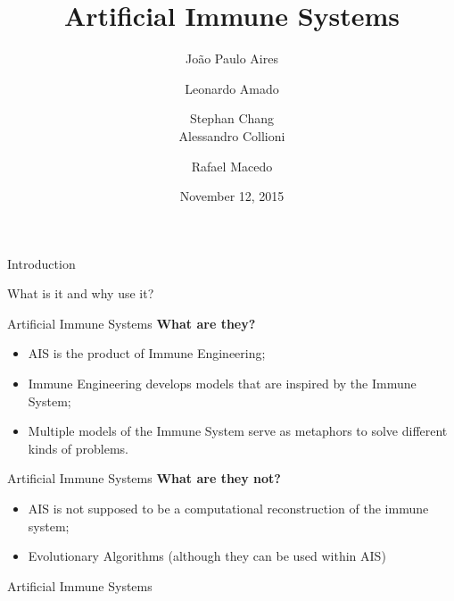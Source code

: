 \documentclass[xcolor=svgnames]{beamer}
\title{Artificial Immune Systems}
\author[Aires, Amado, Chang, Collioni, Macedo]
    {
        João Paulo Aires\and
        Leonardo Amado\and
        Stephan Chang\\ \vspace{0.25em}
        Alessandro Collioni\and
        Rafael Macedo
    }
\date{November 12, 2015}
\institute
    {
        Pontifical Catholic University of Rio Grande do Sul, PUCRS\\
        Porto Alegre -- Brazil
    }
\newcommand{\introframe}[2]{
    \begin{frame}
       \vfill
       \hfill\Huge{#1}
       
       \vspace{1em}
       
       \hfill\Large{#2}
       \vfill
    \end{frame}
}
\begin{document}
    \maketitle

    \introframe{Introduction}{What is it and why use it?}
    
    \begin{frame}{Artificial Immune Systems}
        \textbf{What are they?}
        
        \begin{itemize}
            \item AIS is the product of Immune Engineering;
                \item Immune Engineering develops models that are inspired by the Immune System;
            \item Multiple models of the Immune System serve as  metaphors to solve different kinds of problems.
        \end{itemize}        
    \end{frame}
    
    \begin{frame}{Artificial Immune Systems}            
        \textbf{What are they not?}
        
        \begin{itemize}
            \item AIS is not supposed to be a computational reconstruction of the immune system;
            \item Evolutionary Algorithms (although they can be used within AIS)
        \end{itemize}    
    \end{frame}
        
        \begin{frame}{Artificial Immune Systems}
            \begin{itemize}
            \end{itemize}
        \end{frame}
    
\end{document}
